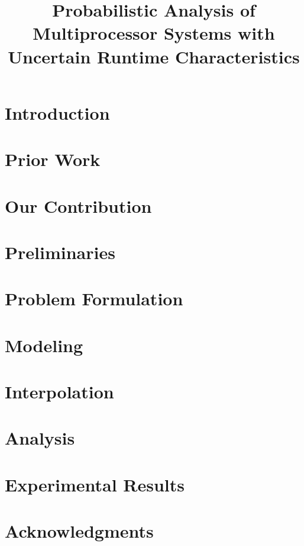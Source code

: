 \documentclass[journal]{IEEEtran}
\title{
  Probabilistic Analysis of Multiprocessor Systems
  with Uncertain Runtime Characteristics
}
\author{}
\begin{document}
  \maketitle

  \begin{abstract}
    
  \end{abstract}


  \section{Introduction}
  

  \section{Prior Work}
  

  \section{Our Contribution}
  

  \section{Preliminaries}
  

  \section{Problem Formulation} 
  

  \section{Modeling} 
  

  \section{Interpolation} 
  

  \section{Analysis}
  

  \section{Experimental Results}
  

  \section*{Acknowledgments}
  

  \begingroup
    
    
  \endgroup
\end{document}

